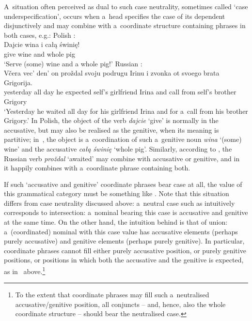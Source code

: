 \documentclass[output=paper]{langsci/langscibook}
\begin{document}
A~situation often perceived as dual to such case neutrality, sometimes called `case underspecification’, occurs when a~head specifies the case of its dependent disjunctively and may combine with a~coordinate structure containing phrases in both cases, e.g.:
\ea
\label{ex:dis:pl} Polish \citep[175]{Prze99b}: \\ [1ex]
\gll Dajcie wina i całą świnię! \\
    give wine\GEN{} and whole\ACC{} pig\ACC{}\\
\glt  `Serve (some) wine and a whole pig!’
\z
\ea
\label{ex:dis:ru} Russian \citep[11]{levy:01}: \\ [1ex]
\gll V{\v c}era vec' den' on pro{\v z}dal svoju podrugu Irinu i zvonka ot svoego brata Grigorija. \\
    yesterday all day he expected self's\ACC{} girlfriend\ACC{} Irina\ACC{} and call\GEN{} from self's brother Grigory\\
\glt  `Yesterday he waited all day for his girlfriend Irina and for a~call from his brother Grigory.’
\z
In Polish, the object of the verb \emph{dajcie} `give’ is normally in the accusative, but may also be realised as the genitive, when its meaning is partitive; in~, the object is a~coordination of such a~genitive noun \emph{wina} `(some) wine’ and the accusative \emph{całą świnię} `whole pig’.  Similarly, according to \citealt{levy:01}, the Russian verb \emph{pro{\v z}dal} `awaited’ may combine with accusative or genitive, and in~ it happily combines with a~coordinate phrase containing both.

If such `accusative and genitive’ coordinate phrases bear case at all, the value of this grammatical category must be something like .  Note that this situation differs from case neutrality discussed above: a~neutral case such as  intuitively corresponds to intersection: a~nominal bearing this case is accusative and genitive at the same time.  On the other hand, the intuition behind  is that of union: a~(coordinated) nominal with this case value has accusative elements (perhaps purely accusative) and genitive elements (perhaps purely genitive).  In particular,  coordinate phrases cannot fill either purely accusative position, or purely genitive positions, or positions in which both the accusative and the genitive is expected, as in~ above.\footnote{To the extent that coordinate phrases may fill such a~neutralised accusative/genitive position, all conjuncts – and, hence, also the whole coordinate structure – should bear the neutralised  case.}
\end{document}
